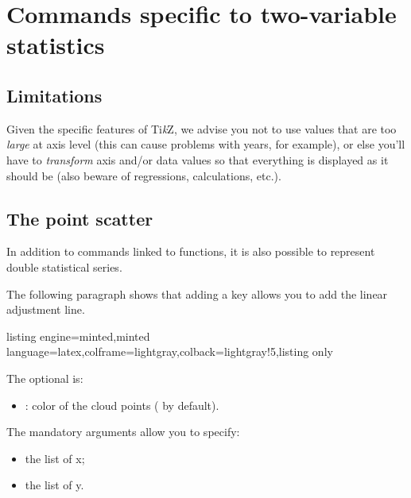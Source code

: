 \documentclass[11pt,a4paper]{ltxdoc}
\providecommand\tikzlogo{Ti\textit{k}Z}
\let\TikZ\tikzlogo
\begin{document}
\pagebreak

\section{Commands specific to two-variable statistics}

\subsection{Limitations}

Given the specific features of \TikZ, we advise you not to use values that are too \textit{large} at axis level (this can cause problems with years, for example), or else you'll have to \textit{transform} axis and/or data values so that everything is displayed as it should be (also beware of regressions, calculations, etc.).

\subsection{The point scatter}\label{scatter}

In addition to commands linked to functions, it is also possible to represent double statistical series.

\smallskip

The following paragraph shows that adding a key allows you to add the linear adjustment line.

\begin{tcblisting}{listing engine=minted,minted language=latex,colframe=lightgray,colback=lightgray!5,listing only}
\end{tcblisting}

The optional \MontreCode{[key]} is:

\smallskip

\begin{itemize}
	\item {}: color of the cloud points ( by default).
\end{itemize}

\smallskip

The mandatory arguments allow you to specify:

\smallskip

\begin{itemize}
	\item the list of x;
	\item the list of y.
\end{itemize}
\end{document}

